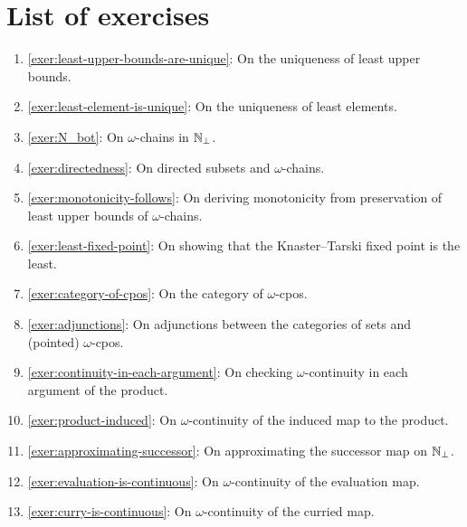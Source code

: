 \section{List of exercises}
\begin{enumerate}
\item \cref{exer:least-upper-bounds-are-unique}: On the uniqueness of least upper bounds.
\item \cref{exer:least-element-is-unique}: On the uniqueness of least elements.
\item \cref{exer:N_bot}: On \(\omega\)-chains in \(\mathbb N_\bot\).
\item \cref{exer:directedness}: On directed subsets and \(\omega\)-chains.
\item \cref{exer:monotonicity-follows}: On deriving monotonicity from preservation of
  least upper bounds of \(\omega\)-chains.
\item \cref{exer:least-fixed-point}: On showing that the Knaster--Tarski fixed point
  is the least.
\item \cref{exer:category-of-cpos}: On the category of \(\omega\)-cpos.
\item \cref{exer:adjunctions}: On adjunctions between the categories of sets and
  (pointed) \(\omega\)-cpos.
\item \cref{exer:continuity-in-each-argument}: On checking \(\omega\)-continuity
  in each argument of the product.
\item \cref{exer:product-induced}: On \(\omega\)-continuity of the induced map
  to the product.
\item \cref{exer:approximating-successor}: On approximating the successor map on
  \(\mathbb N_\bot\).
\item \cref{exer:evaluation-is-continuous}: On \(\omega\)-continuity of the evaluation map.
\item \cref{exer:curry-is-continuous}: On \(\omega\)-continuity of the curried map.
\end{enumerate}

